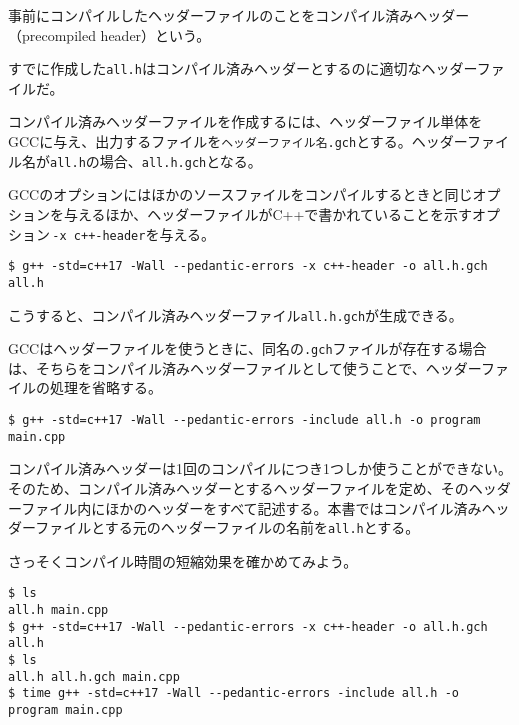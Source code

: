 事前にコンパイルしたヘッダーファイルのことをコンパイル済みヘッダー（precompiled header）という。

すでに作成した\texttt{all.h}はコンパイル済みヘッダーとするのに適切なヘッダーファイルだ。

コンパイル済みヘッダーファイルを作成するには、ヘッダーファイル単体をGCCに与え、出力するファイルを\texttt{ヘッダーファイル名.gch}とする。ヘッダーファイル名が\texttt{all.h}の場合、\texttt{all.h.gch}となる。

GCCのオプションにはほかのソースファイルをコンパイルするときと同じオプションを与えるほか、ヘッダーファイルがC++で書かれていることを示すオプション\,\texttt{-x c++-header}を与える。

\begin{lstlisting}[style=terminal]
$ g++ -std=c++17 -Wall --pedantic-errors -x c++-header -o all.h.gch all.h
\end{lstlisting}

こうすると、コンパイル済みヘッダーファイル\texttt{all.h.gch}が生成できる。

GCCはヘッダーファイルを使うときに、同名の\texttt{.gch}ファイルが存在する場合は、そちらをコンパイル済みヘッダーファイルとして使うことで、ヘッダーファイルの処理を省略する。

\begin{lstlisting}[style=terminal]
$ g++ -std=c++17 -Wall --pedantic-errors -include all.h -o program main.cpp
\end{lstlisting}

コンパイル済みヘッダーは1回のコンパイルにつき1つしか使うことができない。そのため、コンパイル済みヘッダーとするヘッダーファイルを定め、そのヘッダーファイル内にほかのヘッダーをすべて記述する。本書ではコンパイル済みヘッダーファイルとする元のヘッダーファイルの名前を\texttt{all.h}とする。

さっそくコンパイル時間の短縮効果を確かめてみよう。

\begin{lstlisting}[style=terminal]
$ ls
all.h main.cpp
$ g++ -std=c++17 -Wall --pedantic-errors -x c++-header -o all.h.gch all.h
$ ls
all.h all.h.gch main.cpp
$ time g++ -std=c++17 -Wall --pedantic-errors -include all.h -o program main.cpp
\end{lstlisting}

\clearpage
{}

